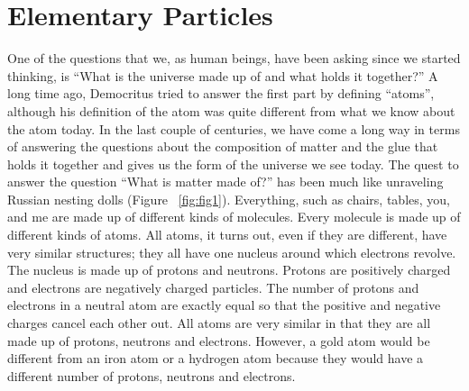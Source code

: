 
\section{Elementary Particles}
One of the questions that we, as human beings, have been asking since we started thinking, is ``What is the universe made up of and what holds it together?'' A long time ago, Democritus tried to answer the first part by defining “atoms”, although his definition of the atom was quite different from what we know about the atom today. In the last couple of centuries, we have come a long way in terms of answering the questions about the composition of matter and the glue that holds it together and  gives us the form of the universe we see today.
The quest to answer the question ``What is matter made of?'' 
has been much like unraveling Russian nesting dolls (Figure ~\ref{fig:fig1}). 
Everything, such as chairs, tables, you, and me are 
made up of different kinds of molecules. Every molecule is made up of different kinds of atoms. All atoms, it turns out, even if they are different, have very similar structures; they all have one nucleus around which electrons revolve. The nucleus is made up of protons and neutrons. Protons are positively charged and electrons are negatively charged particles. The number of protons and electrons in a neutral atom are exactly equal so that the positive and negative charges cancel each other out.  All atoms are very similar in that they are all made up of protons, neutrons and electrons. However, a gold atom would be different from an iron atom or a hydrogen atom because they would have a different number of protons, neutrons and electrons.  





